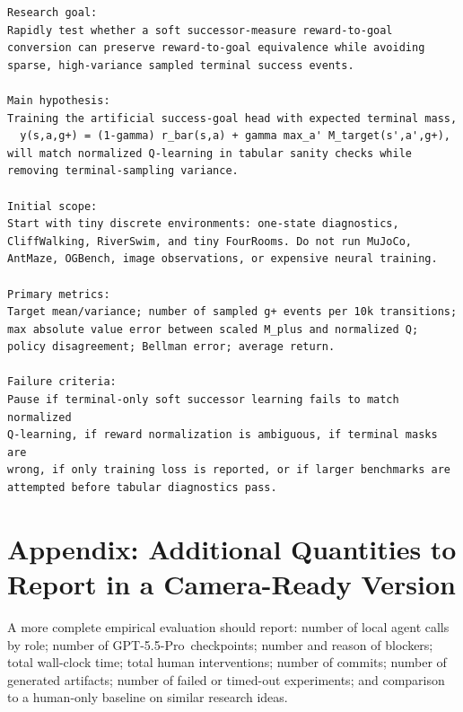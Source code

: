 \documentclass{article}
\newcommand{\gptpro}{GPT-5.5-Pro}
\begin{document}
\begin{verbatim}
Research goal:
Rapidly test whether a soft successor-measure reward-to-goal
conversion can preserve reward-to-goal equivalence while avoiding
sparse, high-variance sampled terminal success events.

Main hypothesis:
Training the artificial success-goal head with expected terminal mass,
  y(s,a,g+) = (1-gamma) r_bar(s,a) + gamma max_a' M_target(s',a',g+),
will match normalized Q-learning in tabular sanity checks while
removing terminal-sampling variance.

Initial scope:
Start with tiny discrete environments: one-state diagnostics,
CliffWalking, RiverSwim, and tiny FourRooms. Do not run MuJoCo,
AntMaze, OGBench, image observations, or expensive neural training.

Primary metrics:
Target mean/variance; number of sampled g+ events per 10k transitions;
max absolute value error between scaled M_plus and normalized Q;
policy disagreement; Bellman error; average return.

Failure criteria:
Pause if terminal-only soft successor learning fails to match normalized
Q-learning, if reward normalization is ambiguous, if terminal masks are
wrong, if only training loss is reported, or if larger benchmarks are
attempted before tabular diagnostics pass.
\end{verbatim}

\section{Appendix: Additional Quantities to Report in a Camera-Ready Version}

A more complete empirical evaluation should report: number of local agent calls by role; number of \gptpro\ checkpoints; number and reason of blockers; total wall-clock time; total human interventions; number of commits; number of generated artifacts; number of failed or timed-out experiments; and comparison to a human-only baseline on similar research ideas.
\end{document}
